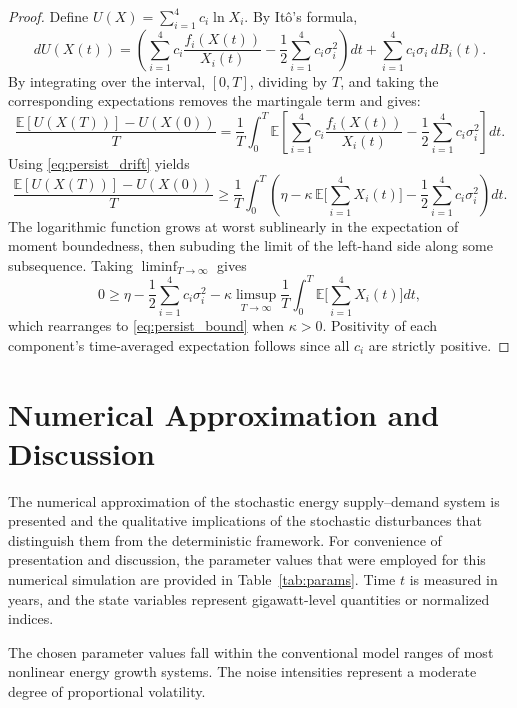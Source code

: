 \documentclass[11pt]{article}
\numberwithin{equation}{section}
\begin{document}
\begin{proof}
Define $U(X)=\sum_{i=1}^4 c_i\ln X_i$. By It\^o's formula,
\begin{equation}\label{eq:Ito_U}
dU(X(t))
=\left(\sum_{i=1}^4 c_i\frac{f_i(X(t))}{X_i(t)}
-\frac{1}{2}\sum_{i=1}^4 c_i\sigma_i^2\right)dt
+\sum_{i=1}^4 c_i\sigma_i\,dB_i(t).
\end{equation}
By integrating over the interval, $[0,T]$, dividing by $T$, and taking the corresponding expectations removes the martingale term and gives:
\[
\frac{\mathbb{E}[U(X(T))]-U(X(0))}{T}
=\frac{1}{T}\int_0^T
\mathbb{E}\left[
\sum_{i=1}^4 c_i\frac{f_i(X(t))}{X_i(t)}
-\frac{1}{2}\sum_{i=1}^4 c_i\sigma_i^2
\right]dt.
\]
Using \eqref{eq:persist_drift} yields
\[
\frac{\mathbb{E}[U(X(T))]-U(X(0))}{T}
\ge
\frac{1}{T}\int_0^T
\left(
\eta-\kappa\,\mathbb{E}\Big[\sum_{i=1}^4 X_i(t)\Big]
-\frac{1}{2}\sum_{i=1}^4 c_i\sigma_i^2
\right)dt.
\]
The logarithmic function grows at worst sublinearly in the expectation of moment boundedness, then subuding the limit of the left-hand side along some subsequence. Taking $\liminf_{T\to\infty}$ gives
\[
0\ge \eta-\frac{1}{2}\sum_{i=1}^4 c_i\sigma_i^2
-\kappa\limsup_{T\to\infty}\frac{1}{T}\int_0^T
\mathbb{E}\Big[\sum_{i=1}^4 X_i(t)\Big]dt,
\]
which rearranges to \eqref{eq:persist_bound} when $\kappa>0$. Positivity of each component’s time-averaged expectation follows since all $c_i$ are strictly positive.
\end{proof}

\section{Numerical Approximation and Discussion}

The numerical approximation of the stochastic energy supply–demand system is presented and the qualitative implications of the stochastic disturbances that distinguish them from the deterministic framework. For convenience of presentation and discussion, the parameter values that were employed for this numerical simulation are provided in Table~\ref{tab:params}. Time $t$ is measured in years, and the state variables represent gigawatt-level quantities or normalized indices.

The chosen parameter values fall within the conventional model ranges of most nonlinear energy growth systems. The noise intensities represent a moderate degree of proportional volatility.
\end{document}
